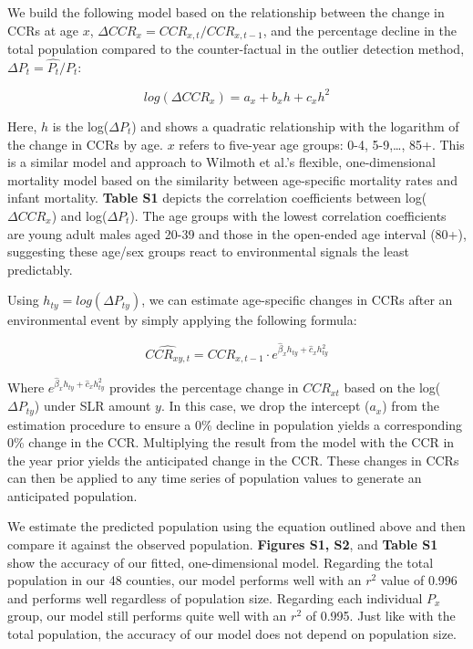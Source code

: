 \documentclass[12pt]{article}
\begin{document}
We build the following model based on the relationship between the
change in CCRs at age \(x\), \(\Delta CCR_x = CCR_{x,t} / CCR_{x,t-1}\),
and the percentage decline in the total population compared to the
counter-factual in the outlier detection method,
\(\Delta P_t = \hat{P_t} / P_t\):

\[log(\Delta CCR_x) = a_x + b_xh + c_xh^2 \tag{3}\]

Here, \(h\) is the log(\(\Delta P_t\)) and shows a quadratic
relationship with the logarithm of the change in CCRs by age. \(x\)
refers to five-year age groups: 0-4, 5-9,\ldots, 85+. This is a similar
model and approach to Wilmoth et al.'s \citep{wilmoth2012flexible}
flexible, one-dimensional mortality model based on the similarity
between age-specific mortality rates and infant mortality.
\textbf{Table S1} depicts the correlation coefficients between
log(\(\Delta CCR_x\)) and log(\(\Delta P_t\)). The age groups with the
lowest correlation coefficients are young adult males aged 20-39 and
those in the open-ended age interval (80+), suggesting these age/sex
groups react to environmental signals the least predictably.

Using \(h_{ty}=log(\Delta P_{ty})\), we can estimate age-specific
changes in CCRs after an environmental event by simply applying the
following formula:

\begin{equation}
    \hat{CCR_{xy,t}} = CCR_{x,t-1} \cdot e^{\hat\beta_xh_{ty}+\hat c_xh^2_{ty}} \label{eq:migmodel}
\end{equation}

Where \(e^{\hat\beta_xh_{ty}+\hat c_xh^2_{ty}}\) provides the percentage
change in \(CCR_{xt}\) based on the log(\(\Delta{P_{ty}}\)) under SLR
amount \(y\). In this case, we drop the intercept (\(a_x\)) from the
estimation procedure to ensure a 0\% decline in population yields a
corresponding 0\% change in the CCR. Multiplying the result from the
model with the CCR in the year prior yields the anticipated change in
the CCR. These changes in CCRs can then be applied to any time series of
population values to generate an anticipated population.

We estimate the predicted population using the equation outlined above
and then compare it against the observed population.
\textbf{Figures S1, S2}, and \textbf{Table S1} show the accuracy of our
fitted, one-dimensional model. Regarding the total population in our 48
counties, our model performs well with an \(r^2\) value of 0.996 and
performs well regardless of population size. Regarding each individual
\(P_x\) group, our model still performs quite well with an \(r^2\) of
0.995. Just like with the total population, the accuracy of our model
does not depend on population size.
\end{document}
